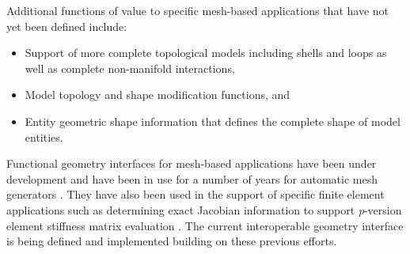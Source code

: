 Additional functions of value to specific mesh-based applications that have not yet 
been defined include:
\begin{itemize}
\item Support of more complete topological models including shells and loops 
as well as complete non-manifold interactions,
\item Model topology and shape modification functions, and
\item Entity geometric shape information that defines the complete shape 
of model entities.
\end{itemize}

Functional geometry interfaces for mesh-based applications have been
under development and have been in use for a number of years for
automatic mesh generators \cite{BeWa04,ShGe92}. They have also been
used in the support of specific finite element applications such as
determining exact Jacobian information to support {\it p}-version
element stiffness matrix evaluation \cite{BeSh99}.  The current
interoperable geometry interface is being defined and implemented
building on these previous efforts.


